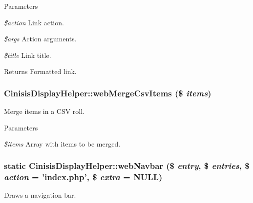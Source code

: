 \begin{DoxyParams}{Parameters}
\item[{\em \$action}]Link action.\item[{\em \$args}]Action arguments.\item[{\em \$title}]Link title.\end{DoxyParams}
\begin{DoxyReturn}{Returns}
Formatted link. 
\end{DoxyReturn}
\hypertarget{classCinisisDisplayHelper_a6c4042683e787ae54cd9e0c88c83606c}{
\subsubsection[{webMergeCsvItems}]{\setlength{\rightskip}{0pt plus 5cm}CinisisDisplayHelper::webMergeCsvItems (\$ {\em items})}}
\label{classCinisisDisplayHelper_a6c4042683e787ae54cd9e0c88c83606c}
Merge items in a CSV roll.


\begin{DoxyParams}{Parameters}
\item[{\em \$items}]Array with items to be merged. \end{DoxyParams}
\hypertarget{classCinisisDisplayHelper_a291e2da97fd646e7fa34fb92879fc3d6}{
\subsubsection[{webNavbar}]{\setlength{\rightskip}{0pt plus 5cm}static CinisisDisplayHelper::webNavbar (\$ {\em entry}, \/  \$ {\em entries}, \/  \$ {\em action} = {\ttfamily 'index.php'}, \/  \$ {\em extra} = {\ttfamily NULL})}}
\label{classCinisisDisplayHelper_a291e2da97fd646e7fa34fb92879fc3d6}
Draws a navigation bar.


